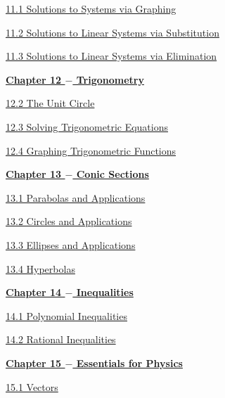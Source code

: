\documentclass[lang=en,11pt]{elegantbook}
\begin{document}
\href{https://cdn.kutasoftware.com/Worksheets/Alg2/Systems%20of%20Two%20Equations.pdf}{11.1   Solutions to Systems via Graphing}

\href{https://cdn.kutasoftware.com/Worksheets/Alg2/Systems%20of%20Three%20Equations%20Substitution.pdf}{11.2   Solutions to Linear Systems via Substitution}

\href{https://cdn.kutasoftware.com/Worksheets/Alg2/Systems%20of%20Three%20Equations%20Elimination.pdf}{11.3   Solutions to Linear Systems via Elimination}

\noindent \underline{\textbf{Chapter 12 $-$ Trigonometry}}

\href{https://cdn.kutasoftware.com/Worksheets/Precalc/04%20-%20Trig%20Ratios%20of%20Any%20Angle.pdf}{12.2   The Unit Circle}

\href{https://cdn.kutasoftware.com/Worksheets/Precalc/04%20-%20Simple%20Trig%20Equations.pdf}{12.3   Solving Trigonometric Equations}

\href{https://cdn.kutasoftware.com/Worksheets/Precalc/04%20-%20Graphs%20of%20Trig%20Functions.pdf}{12.4   Graphing Trigonometric Functions}

\noindent \underline{\textbf{Chapter 13 $-$ Conic Sections}}

\href{https://cdn.kutasoftware.com/Worksheets/Precalc/10%20-%20Parabolas.pdf}{13.1  Parabolas and Applications}

\href{https://cdn.kutasoftware.com/Worksheets/Precalc/10%20-%20Circles.pdf}{13.2   Circles and Applications}

\href{https://cdn.kutasoftware.com/Worksheets/Precalc/10%20-%20Ellipses.pdf}{13.3  Ellipses and Applications}

\href{https://cdn.kutasoftware.com/Worksheets/Precalc/10%20-%20Hyperbolas.pdf}{13.4   Hyperbolas}

\noindent \underline{\textbf{Chapter 14 $-$ Inequalities}}

\href{https://cdn.kutasoftware.com/Worksheets/Precalc/02%20-%20Polynomial%20Inequalities.pdf}{14.1  Polynomial Inequalities}

\href{https://cdn.kutasoftware.com/Worksheets/Precalc/02%20-%20Rational%20Inequalities.pdf}{14.2   Rational Inequalities}

\noindent \underline{\textbf{Chapter 15 $-$ Essentials for Physics}}

\href{https://cdn.kutasoftware.com/Worksheets/Precalc/07%20-%20Vector%20Basics.pdf}{15.1   Vectors}
\end{document}
